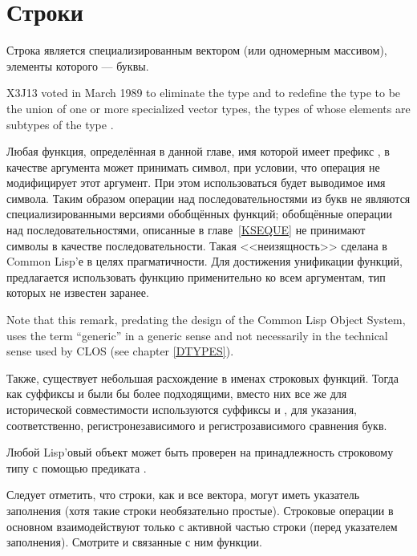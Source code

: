 \else

\chapter{Строки}
\def\pagestatus{FINAL PROOF}

Строка является специализированным вектором (или одномерным массивом), элементы
которого --- буквы.

\begin{newer}
X3J13 voted in March 1989 
to eliminate the type  and to redefine the type
 to be the union of one or more specialized vector
types, the types of whose elements are subtypes of the type .
\end{newer}

Любая функция, определённая в данной главе, имя которой имеет префикс
, в качестве аргумента может принимать символ, при
условии, что операция не модифицирует этот аргумент.
При этом использоваться будет выводимое имя символа.
Таким образом операции над последовательностями из букв не
являются специализированными версиями обобщённых функций; обобщённые операции
над последовательностями, описанные в главе~\ref{KSEQUE} не принимают символы в
качестве последовательности. Такая <<неизящность>> сделана в Common Lisp'е в
целях прагматичности. Для достижения унификации функций, предлагается использовать
функцию  применительно ко всем аргументам, тип которых не известен заранее.

\begin{new}
Note that this remark, predating the design of the Common Lisp Object System,
uses the term ``generic'' in a generic sense and not necessarily
in the technical sense used by CLOS
(see chapter \ref{DTYPES}).
\end{new}

Также, существует небольшая расхождение в именах строковых функций.
Тогда как суффиксы  и  были бы более подходящими, вместо
них все же для исторической совместимости используются суффиксы  и
\cdf{=}, для указания, соответственно, регистронезависимого и регистрозависимого
сравнения букв.

Любой Lisp'овый объект может быть проверен на принадлежность строковому типу с
помощью предиката .

Следует отметить, что строки, как и все вектора, могут иметь указатель
заполнения (хотя такие строки необязательно простые).
Строковые операции в основном взаимодействуют только с активной частью строки
(перед указателем заполнения). Смотрите  и связанные с ним
функции.

